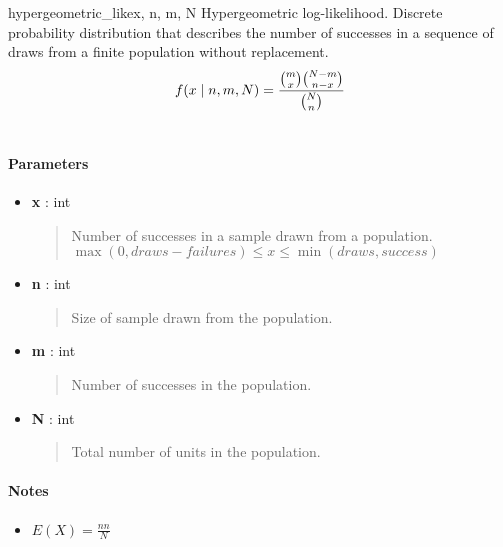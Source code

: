\hypertarget{pymc.distributions.hypergeometric_like}{}\begin{funcdesc}{hypergeometric\_like}{x, n, m, N}
Hypergeometric log-likelihood. Discrete probability distribution that
describes the number of successes in a sequence of draws from a finite
population without replacement.
\begin{gather}
\begin{split}f(x \mid n, m, N) = \frac{\binom{m}{x}\binom{N-m}{n-x}}{\binom{N}{n}}\end{split}\notag\\\begin{split}\end{split}\notag
\end{gather}
\paragraph{Parameters}
\begin{itemize}
\item[] \textbf{x} : int
\begin{quote}
Number of successes in a sample drawn from a population.
$\max(0, draws-failures) \leq x \leq \min(draws, success)$
\end{quote}
\item[] \textbf{n} : int
\begin{quote}
Size of sample drawn from the population.
\end{quote}
\item[] \textbf{m} : int
\begin{quote}
Number of successes in the population.
\end{quote}
\item[] \textbf{N} : int
\begin{quote}
Total number of units in the population.
\end{quote}
\end{itemize}
\paragraph{Notes}
\begin{itemize}
\item $E(X) = \frac{n n}{N}$
\end{itemize}
\end{funcdesc}

